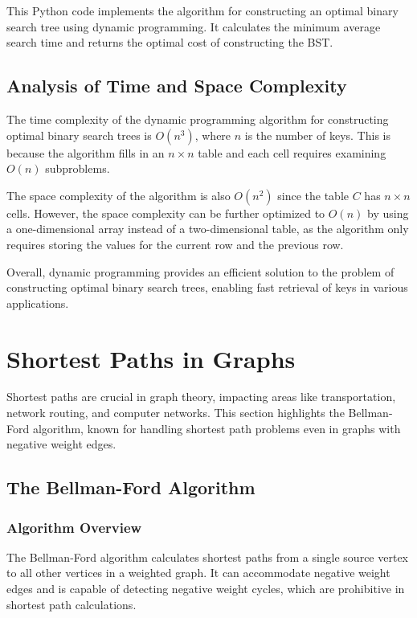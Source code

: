 \documentclass[12pt]{book} %
\begin{document}
\FloatBarrier
This Python code implements the algorithm for constructing an optimal binary search tree using dynamic programming. It calculates the minimum average search time and returns the optimal cost of constructing the BST.

\subsection{Analysis of Time and Space Complexity}

The time complexity of the dynamic programming algorithm for constructing optimal binary search trees is \(O(n^3)\), where \(n\) is the number of keys. This is because the algorithm fills in an \(n \times n\) table and each cell requires examining \(O(n)\) subproblems.

The space complexity of the algorithm is also \(O(n^2)\) since the table \(C\) has \(n \times n\) cells. However, the space complexity can be further optimized to \(O(n)\) by using a one-dimensional array instead of a two-dimensional table, as the algorithm only requires storing the values for the current row and the previous row.

Overall, dynamic programming provides an efficient solution to the problem of constructing optimal binary search trees, enabling fast retrieval of keys in various applications.

\section{Shortest Paths in Graphs}

Shortest paths are crucial in graph theory, impacting areas like transportation, network routing, and computer networks. This section highlights the Bellman-Ford algorithm, known for handling shortest path problems even in graphs with negative weight edges.

\subsection{The Bellman-Ford Algorithm}

\subsubsection{Algorithm Overview}

The Bellman-Ford algorithm calculates shortest paths from a single source vertex to all other vertices in a weighted graph. It can accommodate negative weight edges and is capable of detecting negative weight cycles, which are prohibitive in shortest path calculations.
\end{document}
